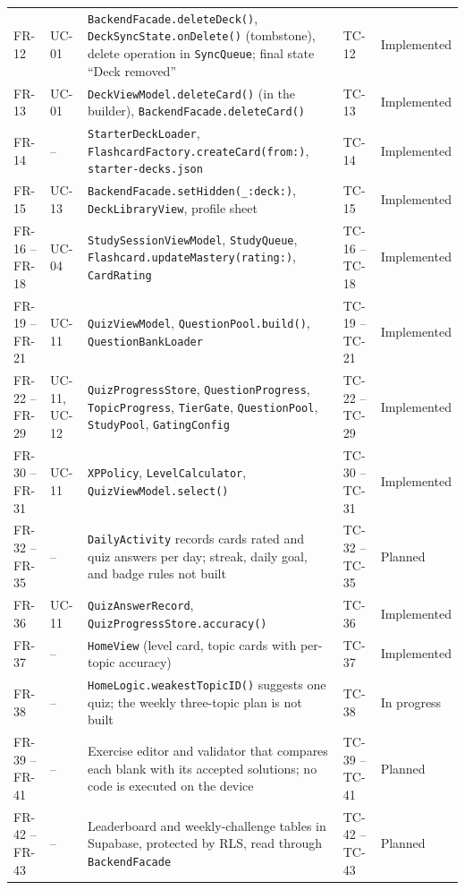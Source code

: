 \documentclass[12pt,letterpaper]{article}
\begin{document}
\begin{xltabular}{\textwidth}{@{}l L{1.6cm} Y l l@{}}
FR-12 & UC-01 & \texttt{BackendFacade.deleteDeck()}, \texttt{DeckSyncState.onDelete()} (tombstone), delete operation in \texttt{SyncQueue}; final state ``Deck removed'' & TC-12 & Implemented \\
FR-13 & UC-01 & \texttt{DeckViewModel.deleteCard()} (in the builder), \texttt{BackendFacade.deleteCard()} & TC-13 & Implemented \\
FR-14 & -- & \texttt{StarterDeckLoader}, \texttt{FlashcardFactory.createCard(from:)}, \texttt{starter-decks.json} & TC-14 & Implemented \\
FR-15 & UC-13 & \texttt{BackendFacade.setHidden(\_:deck:)}, \texttt{DeckLibraryView}, profile sheet & TC-15 & Implemented \\
FR-16 -- FR-18 & UC-04 & \texttt{StudySessionViewModel}, \texttt{StudyQueue}, \texttt{Flashcard.updateMastery(rating:)}, \texttt{CardRating} & TC-16 -- TC-18 & Implemented \\
FR-19 -- FR-21 & UC-11 & \texttt{QuizViewModel}, \texttt{QuestionPool.build()}, \texttt{QuestionBankLoader} & TC-19 -- TC-21 & Implemented \\
FR-22 -- FR-29 & UC-11, UC-12 & \texttt{QuizProgressStore}, \texttt{QuestionProgress}, \texttt{TopicProgress}, \texttt{TierGate}, \texttt{QuestionPool}, \texttt{StudyPool}, \texttt{GatingConfig} & TC-22 -- TC-29 & Implemented \\
FR-30 -- FR-31 & UC-11 & \texttt{XPPolicy}, \texttt{LevelCalculator}, \texttt{QuizViewModel.select()} & TC-30 -- TC-31 & Implemented \\
FR-32 -- FR-35 & -- & \texttt{DailyActivity} records cards rated and quiz answers per day; streak, daily goal, and badge rules not built & TC-32 -- TC-35 & Planned \\
FR-36 & UC-11 & \texttt{QuizAnswerRecord}, \texttt{QuizProgressStore.accuracy()} & TC-36 & Implemented \\
FR-37 & -- & \texttt{HomeView} (level card, topic cards with per-topic accuracy) & TC-37 & Implemented \\
FR-38 & -- & \texttt{HomeLogic.weakestTopicID()} suggests one quiz; the weekly three-topic plan is not built & TC-38 & In progress \\
FR-39 -- FR-41 & -- & Exercise editor and validator that compares each blank with its accepted solutions; no code is executed on the device & TC-39 -- TC-41 & Planned \\
FR-42 -- FR-43 & -- & Leaderboard and weekly-challenge tables in Supabase, protected by RLS, read through \texttt{BackendFacade} & TC-42 -- TC-43 & Planned \\

\end{xltabular}
\end{document}
